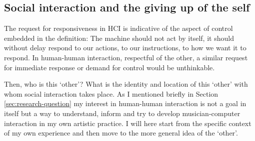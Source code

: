 \subsection{Social interaction and the giving up of the self}
\label{sec:social-interaction}
 The request for responsiveness in HCI is indicative of the aspect of control embedded in the definition: The machine should not act by itself, it should without delay respond to our actions, to our instructions, to how we want it to respond. In human-human interaction, respectful of the other, a similar request for immediate response or demand for control would be unthinkable.

Then, who is this `other'? What is the identity and location of this `other' with whom social interaction takes place. As I mentioned briefly in Section \ref{sec:research-question} my interest in human-human interaction is not a goal in itself but a way to understand, inform and try to develop musician-computer interaction in my own artistic practice. I will here start from the specific context of my own experience and then move to the more general idea of the `other'.

